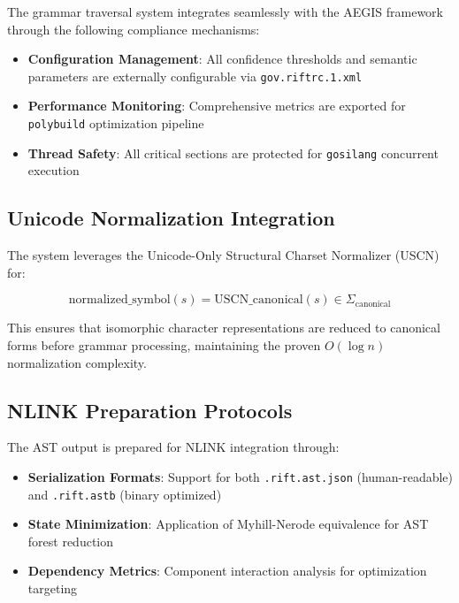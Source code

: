 \documentclass[11pt,a4paper]{article}
\theoremstyle{definition}
\theoremstyle{remark}
\begin{document}
The grammar traversal system integrates seamlessly with the AEGIS framework through the following compliance mechanisms:

\begin{itemize}
\item \textbf{Configuration Management}: All confidence thresholds and semantic parameters are externally configurable via \texttt{gov.riftrc.1.xml}
\item \textbf{Performance Monitoring}: Comprehensive metrics are exported for \texttt{polybuild} optimization pipeline
\item \textbf{Thread Safety}: All critical sections are protected for \texttt{gosilang} concurrent execution
\end{itemize}

\subsection{Unicode Normalization Integration}
\label{subsec:unicode-integration}

The system leverages the Unicode-Only Structural Charset Normalizer (USCN) for:

\begin{equation}
\text{normalized\_symbol}(s) = \text{USCN\_canonical}(s) \in \Sigma_{\text{canonical}}
\end{equation}

This ensures that isomorphic character representations are reduced to canonical forms before grammar processing, maintaining the proven $O(\log n)$ normalization complexity.

\subsection{NLINK Preparation Protocols}
\label{subsec:nlink-preparation}

The AST output is prepared for NLINK integration through:

\begin{itemize}
\item \textbf{Serialization Formats}: Support for both \texttt{.rift.ast.json} (human-readable) and \texttt{.rift.astb} (binary optimized)
\item \textbf{State Minimization}: Application of Myhill-Nerode equivalence for AST forest reduction
\item \textbf{Dependency Metrics}: Component interaction analysis for optimization targeting
\end{itemize}
\end{document}
